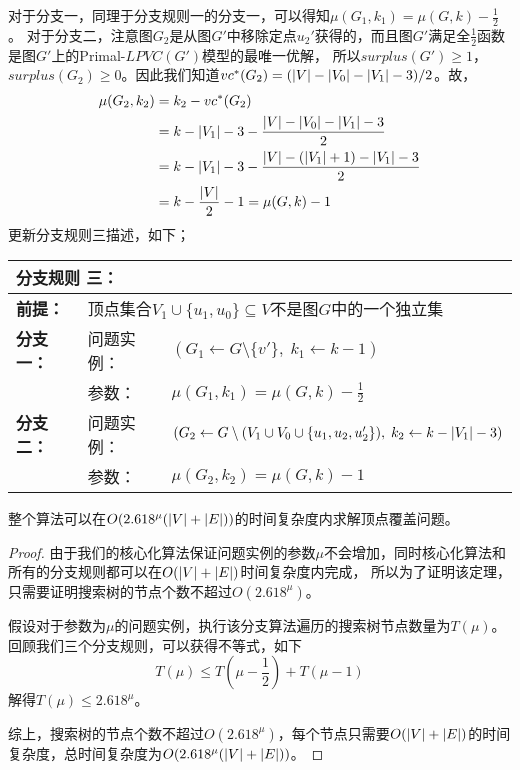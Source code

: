对于分支一，同理于分支规则一的分支一，可以得知$\mu(G_1, k_1) = \mu(G, k) - \frac{1}{2}$。
对于分支二，注意图$G_2$是从图$G'$中移除定点$u_2'$获得的，而且图$G'$满足全$\frac{1}{2}$函数是图$G'$上的Primal-$LPVC(G')$模型的最唯一优解，
所以$surplus(G') \ge 1$，$surplus(G_2) \ge 0$。因此我们知道$vc^*(G_2) = (\left\vert V \right\vert - \left\vert V_0 \right\vert - \left\vert V_1 \right\vert - 3) / 2$。故，
\begin{equation*} \begin{aligned}
    \mu(G_2, k_2) & = k_2 - vc^*(G_2)  \\
                  & = k - \left\vert V_1 \right\vert - 3 - \frac{\left\vert V \right\vert - \left\vert V_0 \right\vert - \left\vert V_1 \right\vert - 3}{2} \\
                  & = k - \left\vert V_1 \right\vert - 3 - \frac{\left\vert V \right\vert - (\left\vert V_1 \right\vert + 1) - \left\vert V_1 \right\vert - 3}{2} \\
                  & = k - \frac{\left\vert V \right\vert}{2} - 1 = \mu(G, k) - 1
\end{aligned} \end{equation*}
更新分支规则三描述，如下；\\

\begin{tabular}{ p{0.12\headwidth} | p{0.12\headwidth}p{0.66\headwidth} }
  \multicolumn{3}{l}{ \textbf{分支规则 三：} }\\
  \hline
  \textbf{前提：}  & \multicolumn{2}{l}{顶点集合$V_1 \cup \{u_1, u_0\}\subseteq V$不是图$G$中的一个独立集}\\
  \hline
  \textbf{分支一：} & 问题实例：&$(G_1 \leftarrow G \setminus \{v'\},\; k_1 \leftarrow k - 1)$ \\
                    & 参数：&$\mu(G_1, k_1) = \mu(G, k) - \frac{1}{2}$\\
  \hline
  \textbf{分支二：} & 问题实例：&$(G_2 \leftarrow G \setminus (V_1\cup V_0  \cup \{u_1, u_2, u_2'\}) ,\; k_2 \leftarrow k - \left\vert V_1 \right\vert - 3)$\\
                    & 参数：&$\mu(G_2, k_2) = \mu(G, k) - 1$\\
  \hline
\end{tabular} \vspace{0.5cm}  


\begin{theorem}
  整个算法可以在$O(2.618^{\mu}(\left\vert V \right\vert + \left\vert E \right\vert))$的时间复杂度内求解顶点覆盖问题。
\end{theorem}
\begin{proof}
  由于我们的核心化算法保证问题实例的参数$\mu$不会增加，同时核心化算法和所有的分支规则都可以在$O(\left\vert V \right\vert + \left\vert E \right\vert)$时间复杂度内完成，
  所以为了证明该定理，只需要证明搜索树的节点个数不超过$O(2.618^{\mu})$。
  
  假设对于参数为$\mu$的问题实例，执行该分支算法遍历的搜索树节点数量为$T(\mu)$。
  回顾我们三个分支规则，可以获得不等式，如下
  \[ T(\mu) \le T(\mu - \frac{1}{2}) + T(\mu - 1) \]
  解得$T(\mu) \le 2.618^{\mu}$。
  
  综上，搜索树的节点个数不超过$O(2.618^{\mu})$，每个节点只需要$O(\left\vert V \right\vert + \left\vert E \right\vert)$的时间复杂度，总时间复杂度为$O(2.618^{\mu}(\left\vert V \right\vert + \left\vert E \right\vert))$。
\end{proof}

\subsection{}
